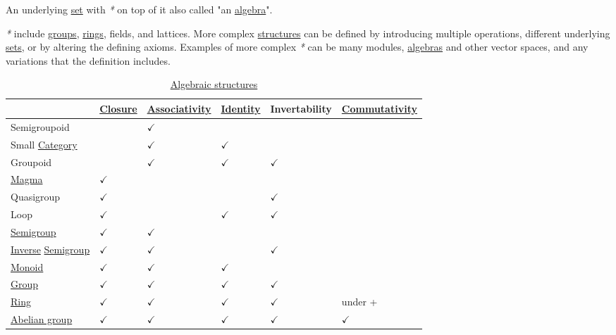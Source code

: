 \documentclass[a4paper,14pt,oneside]{book}
\begin{document}
An underlying \hyperref[org28abdc9]{set} with \emph{*} on top of it also called "an \hyperref[orgefdcb85]{algebra}".

\emph{*} include \hyperref[orgf3ac066]{groups}, \hyperref[orgfce8ba5]{rings}, fields, and lattices. More complex \hyperref[orgbfc87b3]{structures} can be defined by introducing multiple operations, different underlying \hyperref[org8162ad1]{sets}, or by altering the defining axioms. Examples of more complex \emph{*} can be many modules, \hyperref[orga94cecc]{algebras} and other vector spaces, and any variations that the definition includes.

\begin{table}[htbp]
\caption{\label{tab--algebraic-structure}\hyperref[org78367b9]{Algebraic structures}}
\centering
\begin{tabu} spread \linewidth {llllll}
\toprule
 & \hyperref[orge56923d]{Closure} & \hyperref[org9dd9a70]{Associativity} & \hyperref[org5f89edb]{Identity} & Invertability & \hyperref[org4500176]{Commutativity}\\
\midrule
Semigroupoid &  & \(\checkmark\) &  &  & \\
Small \hyperref[org82baa03]{Category} &  & \(\checkmark\) & \(\checkmark\) &  & \\
Groupoid &  & \(\checkmark\) & \(\checkmark\) & \(\checkmark\) & \\
\hyperref[org0eb54f8]{Magma} & \(\checkmark\) &  &  &  & \\
Quasigroup & \(\checkmark\) &  &  & \(\checkmark\) & \\
Loop & \(\checkmark\) &  & \(\checkmark\) & \(\checkmark\) & \\
\hyperref[org171e6aa]{Semigroup} & \(\checkmark\) & \(\checkmark\) &  &  & \\
\hyperref[org5ad120e]{Inverse} \hyperref[org171e6aa]{Semigroup} & \(\checkmark\) & \(\checkmark\) &  & \(\checkmark\) & \\
\hyperref[org9e1ff1f]{Monoid} & \(\checkmark\) & \(\checkmark\) & \(\checkmark\) &  & \\
\hyperref[orgaea08fa]{Group} & \(\checkmark\) & \(\checkmark\) & \(\checkmark\) & \(\checkmark\) & \\
\hyperref[orgcd09e33]{Ring} & \(\checkmark\) & \(\checkmark\) & \(\checkmark\) & \(\checkmark\) & under +\\
\hyperref[orge9d1433]{Abelian group} & \(\checkmark\) & \(\checkmark\) & \(\checkmark\) & \(\checkmark\) & \(\checkmark\)\\
\bottomrule
\end{tabu}
\end{table}
\end{document}
